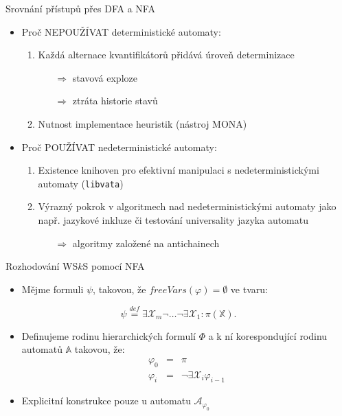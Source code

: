 \documentclass{beamer}
\begin{document}
  \begin{frame}{Srovnání přístupů přes DFA a NFA}
  \begin{itemize}
    \item Proč {\color{red} NEPOUŽÍVAT} deterministické automaty:
    \pause
    \begin{enumerate}
      \item Každá alternace kvantifikátorů přidává úroveň determinizace
      \pause
      \begin{itemize}
        \item[$\Rightarrow$]stavová exploze
      \pause
        \item[$\Rightarrow$]ztráta historie stavů
      \pause
      \end{itemize}
      \item Nutnost implementace heuristik (nástroj MONA)
      \pause
    \end{enumerate}
    \item Proč {\color{green} POUŽÍVAT} nedeterministické automaty:
    \begin{enumerate}
      \pause
      \item Existence knihoven pro efektivní manipulaci s nedeterministickými
      automaty (\texttt{libvata})
      \pause
      \item Výrazný pokrok v algoritmech nad nedeterministickými automaty jako
      např.
      jazykové inkluze či testování universality jazyka automatu
      \begin{itemize}
      \pause
        \item[$\Rightarrow$]algoritmy založené na antichainech
      \end{itemize}
    \end{enumerate}
  \end{itemize}
  \end{frame}
  
  \begin{frame}[t]{Rozhodování WS$k$S pomocí NFA}
  \begin{itemize}
  \item Mějme formuli $\psi$, takovou, že $freeVars(\varphi) = \emptyset$ ve
  tvaru:
  \end{itemize}
  \begin{equation*}
 \psi \overset{\mathit{def}}{=}
 \exists\mathcal{X}_{m}\neg\ldots\neg\exists\mathcal{X}_1: \pi(\mathbb{X}).
\end{equation*}
  \begin{itemize}
    \item Definujeme rodinu hierarchických formulí $\Phi$ a k ní korespondující
    rodinu automatů $\mathbb{A}$ takovou, že:
    \begin{eqnarray}
     \varphi_0 & = & \pi\\
     \varphi_i & = & \neg\exists\mathcal{X}_i\varphi_{i-1}
    \end{eqnarray}
    \item Explicitní konstrukce pouze u automatu $\mathcal{A}_{\varphi_0}$
  \end{itemize}
  
  \end{frame}
  
\end{document}
